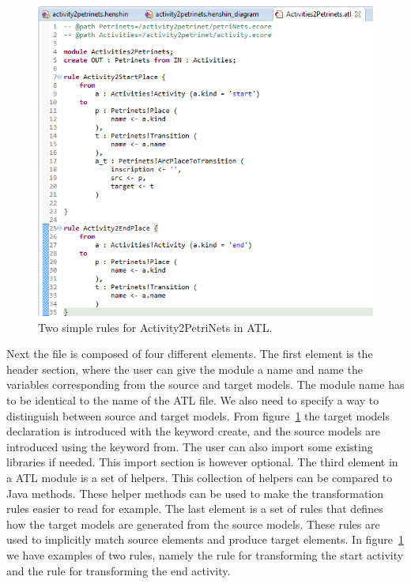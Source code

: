 \documentclass[pdftex,11pt,a4paper]{article}
\begin{document}
\begin{figure}[H]
	\centering
	\includegraphics[scale=0.5]{figures/ATLScreen.png}
	\caption{Two simple rules for Activity2PetriNets in ATL.}
	\label{fig:ATL_Screen}
\end{figure}

Next the file is composed of four different elements. The first element is the
header section, where the user can give the module a name and name the
variables corresponding from the source and target models. The module name has
to be identical to the name of the ATL file. We also need to specify a way to
distinguish between source and target models. From figure~\ref{fig:ATL_Screen}
the target models declaration is introduced with the keyword create, and the
source models are introduced using the keyword from. The user can also import
some existing libraries if needed. This import section is however optional. The
third element in a ATL module is a set of helpers. This collection of helpers
can be compared to Java methods. These helper methods can be used to make the
transformation rules easier to read for example. The last element is a set of
rules that defines how the target models are generated from the source models.
These rules are used to implicitly match source elements and produce target
elements. In figure~\ref{fig:ATL_Screen} we have examples of two rules, namely
the rule for transforming the start activity and the rule for transforming the
end activity. 
\end{document}
